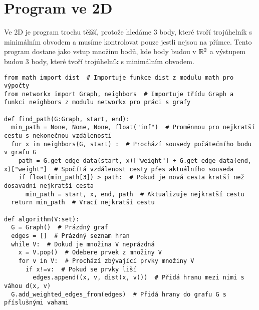 \section{Program ve 2D}
\label{sec:program_2D}

Ve 2D je program trochu těžší, protože hledáme 3 body, které tvoří trojúhelník s minimálním obvodem a musíme kontrolovat pouze jestli nejsou na přímce. Tento program dostane jako vstup množinu bodů, kde body budou v $\mathbb{R}^2$ a výstupem budou 3 body, které tvoří trojúhelník s minimálním obvodem. 

\begin{lstlisting}[style=metoo]
from math import dist  # Importuje funkce dist z modulu math pro výpočty
from networkx import Graph, neighbors  # Importuje třídu Graph a funkci neighbors z modulu networkx pro práci s grafy

def find_path(G:Graph, start, end):
  min_path = None, None, None, float("inf")  # Proměnnou pro nejkratší cestu s nekonečnou vzdáleností
  for x in neighbors(G, start) :  # Prochází sousedy počátečního bodu v grafu G
    path = G.get_edge_data(start, x)["weight"] + G.get_edge_data(end, x)["weight"]  # Spočítá vzdálenost cesty přes aktuálního souseda
    if float(min_path[3]) > path:  # Pokud je nová cesta kratší než dosavadní nejkratší cesta
      min_path = start, x, end, path  # Aktualizuje nejkratší cestu
  return min_path  # Vrací nejkratší cestu

def algorithm(V:set):
  G = Graph()  # Prázdný graf
  edges = []  # Prázdný seznam hran
  while V:  # Dokud je množina V neprázdná
    x = V.pop()  # Odebere prvek z množiny V
    for v in V:  # Prochází zbývající prvky množiny V
      if x!=v:  # Pokud se prvky liší
        edges.append((x, v, dist(x, v)))  # Přidá hranu mezi nimi s váhou d(x, v)
  G.add_weighted_edges_from(edges)  # Přidá hrany do grafu G s příslušnými vahami


\end{lstlisting}
